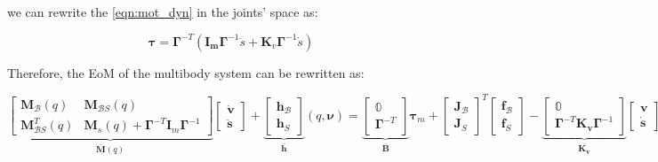 we can rewrite the \cref{eqn:mot_dyn} in the joints' space as:

\begin{equation}
    \label{eqn:mot_dyn_jointspace}
    \boldsymbol{\tau} = \boldsymbol{\Gamma} ^{-T} (\mathbf{I_m}\boldsymbol{\Gamma} ^{-1} \ddot{s} + \mathbf{K}_v \boldsymbol{\Gamma} ^{-1}\dot{s})
\end{equation}

Therefore, the \ac{EoM} of the multibody system can be rewritten as:

\begin{equation}
    \underbrace{\begin{bmatrix}
            \mathbf{M} _{\mathcal{B}}(q)     & \mathbf{M} _{\mathcal{B}S}(q)                                                      \\
            \mathbf{M} _{\mathcal{B}S} ^T(q) & \mathbf{M} _s(q) + \boldsymbol{\Gamma} ^{-T}\mathbf{I} _m\boldsymbol{\Gamma} ^{-1}
        \end{bmatrix}} _{\mathbf{\bar{M}}(q)}
    \begin{bmatrix}
        \dot{\mathrm{\mathbf{v}}} \\
        \ddot{\mathbf{s}}
    \end{bmatrix}+
    \underbrace{\begin{bmatrix}
            \mathbf{h} _{\mathcal{B}} \\
            \mathbf{h} _S
        \end{bmatrix}} _\mathbf{\bar{h}}(q,\boldsymbol{\nu}) =
    \underbrace{\begin{bmatrix}
            \mathbb{0} \\
            \boldsymbol{\Gamma} ^{-T}
        \end{bmatrix}} _{\mathbf{\bar{B}}}
    \boldsymbol{\tau} _m
    +
    \begin{bmatrix}
        \mathbf{J} _{\mathcal{B}} \\
        \mathbf{J} _S
    \end{bmatrix} ^T
    \begin{bmatrix}
        \mathbf{f} _{\mathcal{B}} \\
        \mathbf{f} _S
    \end{bmatrix}-
    \underbrace{\begin{bmatrix}
            \mathbb{0} \\
            \boldsymbol{\Gamma} ^{-T}\mathbf{K _v}\boldsymbol{\Gamma} ^{-1}
        \end{bmatrix}} _\mathbf{\bar{K _v}}
    \begin{bmatrix}
        \mathrm{\mathbf{v}} \\
        \dot{\mathbf{s}}
    \end{bmatrix}
\end{equation}

